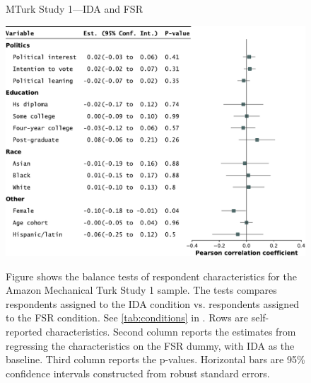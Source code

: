 \begin{center}
	\begin{figure}
		\centering
		\caption{MTurk Study 1---IDA and FSR}
		\includegraphics[width=\textwidth]{../figs/study1-baltest-FSR-ips.pdf}
		\label{fig:baltest-FSR-ips}
		\caption*{\footnotesize 
			Figure shows the balance tests of respondent characteristics for the Amazon Mechanical Turk Study 1 sample.
			The tests compares respondents assigned to the IDA condition vs. respondents assigned to the FSR condition.
			See \cref{tab:conditions} in .
			Rows are self-reported characteristics.
			Second column reports the estimates from regressing the characteristics on the FSR dummy, with IDA as the baseline.
			Third column reports the p-values.
			Horizontal bars are 95\% confidence intervals constructed from robust standard errors.
		}
	\end{figure}
\end{center}

